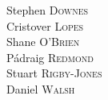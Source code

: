 \begin{authors}
Stephen \textsc{Downes}\\
Cristover \textsc{Lopes}\\
Shane \textsc{O'Brien}\\
P\'{a}draig \textsc{Redmond}\\
Stuart \textsc{Rigby-Jones}\\
Daniel \textsc{Walsh}
\end{authors}
